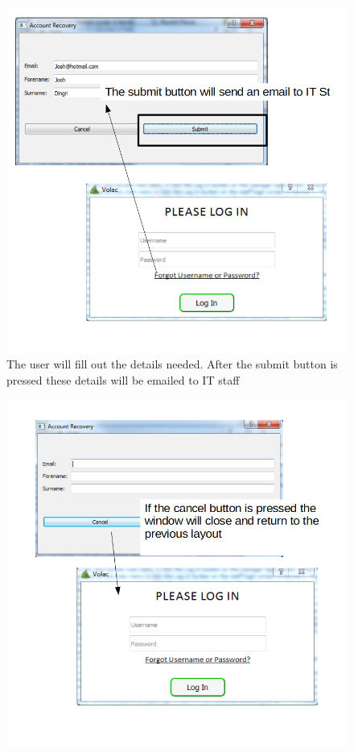 \begin{figure}[H]
    \includegraphics[width=\textwidth]{./Testing/Images/SubmitPassword.png}
    \caption{The user will fill out the details needed. After the submit button is pressed these details will be emailed to IT staff} \label{fig:SubmitPassword}
\end{figure}

\begin{figure}[H]
    \includegraphics[width=\textwidth]{./Testing/Images/FogottenPasswordClose.png}
     \label{fig:FogottenPasswordClose}
\end{figure}


